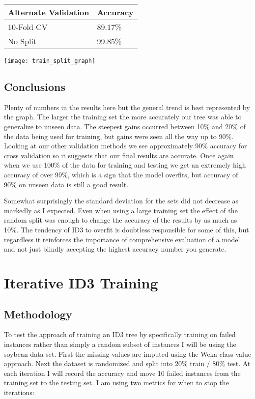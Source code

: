 \documentclass[11pt, letterpaper]{report}
\begin{document}
\bigskip
\begin{tabular}{ |l|l| }
    \hline
    \textbf{Alternate Validation} & \textbf{Accuracy} \\ \hline
    10-Fold CV & 89.17\% \\ \hline
    No Split & 99.85\% \\ \hline
\end{tabular}

\bigskip
\texttt{[image: train\_split\_graph]}

\subsection{Conclusions}

Plenty of numbers in the results here but the general trend is best represented by the graph. The larger the training set the more accurately our tree was able to generalize to unseen data. The steepest gains occurred between 10\% and 20\% of the data being used for training, but gains were seen all the way up to 90\%. Looking at our other validation methods we see approximately 90\% accuracy for cross validation so it suggests that our final results are accurate. Once again when we use 100\% of the data for training and testing we get an extremely high accuracy of over 99\%, which is a sign that the model overfits, but accuracy of 90\% on unseen data is still a good result.

Somewhat surprisingly the standard deviation for the sets did not decrease as markedly as I expected. Even when using a large training set the effect of the random split was enough to change the accuracy of the results by as much as 10\%. The tendency of ID3 to overfit is doubtless responsible for some of this, but regardless it reinforces the importance of comprehensive evaluation of a model and not just blindly accepting the highest accuracy number you generate.

\section{Iterative ID3 Training}

\subsection{Methodology}

To test the approach of training an ID3 tree by specifically training on failed instances rather than simply a random subset of instances I will be using the soybean data set. First the missing values are imputed using the Weka class-value approach. Next the dataset is randomized and split into 20\% train / 80\% test. At each iteration I will record the accuracy and move 10 failed instances from the training set to the testing set. I am using two metrics for when to stop the iterations:
\end{document}
